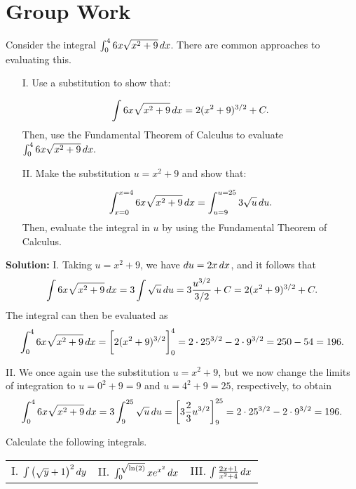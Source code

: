 \documentclass[handout,hints]{ximera}
\begin{document}
\section{Group Work}
\begin{problem}
Consider the integral $\int_0^4  6x\sqrt{x^2+9} \mathop{}\!d x$.  There are common approaches to evaluating this.

\begin{itemize}
\item[I.] Use a substitution to show that:

\[\int  6x\sqrt{x^2+9} \mathop{}\!d x = 2 (x^2 + 9)^{3/2} + C.\]  
Then, use the Fundamental Theorem of Calculus to evaluate $\int_0^4  6x\sqrt{x^2+9} \mathop{}\!d x.$ 

\item[II.] Make the substitution $u=x^2+9$ and show that:

\[\int_{x=0}^{x=4}  6x\sqrt{x^2+9} \mathop{}\!d x = \int_{u=9}^{u=25} 3\sqrt{u} \mathop{}\!d u.\]  Then, evaluate the integral in $u$ by using the Fundamental Theorem of Calculus.
\end{itemize}
\end{problem}

\textbf{Solution:} I. Taking $u=x^2 + 9$, we have $\mathop{}\!d u = 2 x \mathop{}\!d x$, and it follows that
$$
\int  6x\sqrt{x^2+9} \mathop{}\!d x = 3 \int \sqrt{u} \mathop{}\!d u = 3 \frac{u^{3/2}}{3/2} + C = 2 (x^2 + 9)^{3/2} + C. 
$$
The integral can then be evaluated as 
$$
\int_0^4  6x\sqrt{x^2+9} \mathop{}\!d x = \bigg[ 2 (x^2 + 9)^{3/2} \bigg]_0^4 = 2 \cdot 25^{3/2} - 2 \cdot 9^{3/2} = 250 - 54 = 196.
$$

II. We once again use the substitution $u=x^2 + 9$, but we now change the limits of integration to $u=0^2+9=9$ and $u=4^2+9 = 25$, respectively, to obtain
$$
\int_0^4  6x\sqrt{x^2+9} \mathop{}\!d x = 3 \int_9^{25} \sqrt{u} \mathop{}\!d u = \bigg[ 3 \frac{2}{3} u^{3/2} \bigg]_9^{25} = 2 \cdot 25^{3/2} - 2 \cdot 9^{3/2} = 196.
$$
\begin{problem}
Calculate the following integrals.

\begin{tabular}{lll}
I.  $\int \left(\sqrt{y}+1\right)^2 \mathop{}\!d y$ \hspace{.5in} & II. $\int_0^{\sqrt{\ln(2)}} x e^{x^2} \mathop{}\!d x$ \hspace{.5in} & III. $\int \frac{2x+1}{x^2+4} \mathop{}\!d x$ \hspace{.05in}
\end{tabular}

\end{problem}
\end{document}
